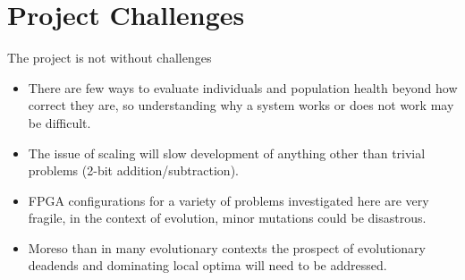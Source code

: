 \section{Project Challenges}
The project is not without challenges
\begin{itemize}
	\item There are few ways to evaluate individuals and population health beyond how
		correct they are, so understanding why a system works or does not work may
		be difficult.
	\item The issue of scaling will slow development of anything other than
		trivial problems (2-bit addition/subtraction).
	\item FPGA configurations for a variety of problems investigated here are very fragile, in the
		context of evolution, minor mutations could be disastrous.
	\item Moreso than in many evolutionary contexts the prospect of evolutionary deadends
		and dominating local optima will need to be addressed.
\end{itemize}
